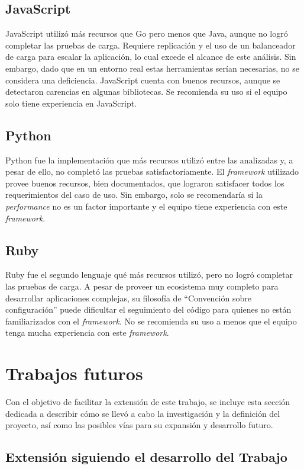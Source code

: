 \documentclass[11pt]{article}
\let\Oldsection\section
\renewcommand{\section}{\FloatBarrier\Oldsection}
\let\Oldsubsection\subsection
\renewcommand{\subsection}{\FloatBarrier\Oldsubsection}
\newcommand{\english}[1]{\textit{#1}}
\begin{document}
\subsection{JavaScript}
JavaScript utilizó más recursos que Go pero menos que Java, aunque no logró completar las pruebas de carga. Requiere replicación y el uso de un balanceador de carga para escalar la aplicación, lo cual excede el alcance de este análisis. Sin embargo, dado que en un entorno real estas herramientas serían necesarias, no se considera una deficiencia. JavaScript cuenta con buenos recursos, aunque se detectaron carencias en algunas bibliotecas. Se recomienda su uso si el equipo solo tiene experiencia en JavaScript.

\subsection{Python}
Python fue la implementación que más recursos utilizó entre las analizadas y, a pesar de ello, no completó las pruebas satisfactoriamente. El \english{framework} utilizado provee buenos recursos, bien documentados, que lograron satisfacer todos los requerimientos del caso de uso. Sin embargo, solo se recomendaría si la \english{performance} no es un factor importante y el equipo tiene experiencia con este \english{framework}.

\subsection{Ruby}
Ruby fue el segundo lenguaje qué más recursos utilizó, pero no logró completar las pruebas de carga. A pesar de proveer un ecosistema muy completo para desarrollar aplicaciones complejas, su filosofía de ``Convención sobre configuración'' puede dificultar el seguimiento del código para quienes no están familiarizados con el \textit{framework}. No se recomienda su uso a menos que el equipo tenga mucha experiencia con este \english{framework}.

\section{Trabajos futuros}

Con el objetivo de facilitar la extensión de este trabajo, se incluye esta sección dedicada a describir cómo se llevó a cabo la investigación y la definición del proyecto, así como las posibles vías para su expansión y desarrollo futuro.

\subsection{Extensión siguiendo el desarrollo del Trabajo}
\end{document}
